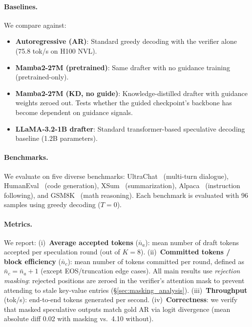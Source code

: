 \paragraph{Baselines.}
We compare against:
\begin{itemize}
  \item \textbf{Autoregressive (AR)}: Standard greedy decoding with the verifier alone (75.8 tok/s on H100 NVL).
  \item \textbf{Mamba2-27M (pretrained)}: Same drafter with no guidance training (pretrained-only).
  \item \textbf{Mamba2-27M (KD, no guide)}: Knowledge-distilled drafter with guidance weights zeroed out. Tests whether the guided checkpoint's backbone has become dependent on guidance signals.
  \item \textbf{LLaMA-3.2-1B drafter}: Standard transformer-based speculative decoding baseline (1.2B parameters).
\end{itemize}

\paragraph{Benchmarks.}
We evaluate on five diverse benchmarks: UltraChat~\citep{ding2023ultrachat} (multi-turn dialogue), HumanEval~\citep{chen2021codex} (code generation), XSum~\citep{narayan2018xsum} (summarization), Alpaca~\citep{taori2023alpaca} (instruction following), and GSM8K~\citep{cobbe2021gsm8k} (math reasoning).
Each benchmark is evaluated with 96 samples using greedy decoding ($T\!=\!0$).

\paragraph{Metrics.}
We report:
(i)~\textbf{Average accepted tokens} ($\bar{n}_a$): mean number of draft tokens accepted per speculation round (out of $K\!=\!8$).
(ii)~\textbf{Committed tokens / block efficiency} ($\bar{n}_c$): mean number of tokens committed per round, defined as $\bar{n}_c = \bar{n}_a + 1$ (except EOS/truncation edge cases).
All main results use \emph{rejection masking}: rejected positions are zeroed in the verifier's attention mask to prevent attending to stale key-value entries (\S\ref{sec:masking_analysis}).
(iii)~\textbf{Throughput} (tok/s): end-to-end tokens generated per second.
(iv)~\textbf{Correctness}: we verify that masked speculative outputs match gold AR via logit divergence (mean absolute diff 0.02 with masking vs.\ 4.10 without).


